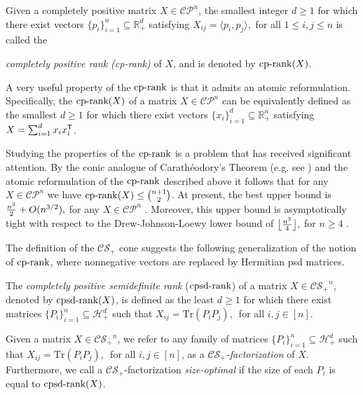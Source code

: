 \documentclass{siamart}
\begin{document}
Given a  completely positive matrix $X\in {\mathcal{CP}}^n$, the smallest integer $d\ge1$ for which there exist vectors $\{p_i\}_{i=1}^n\subseteq {\mathbb{R}}^d_+$  satisfying  $X_{ij}={\langle} p_i,p_j{\rangle},$ for all $1 \leq i,j \leq n$ is called the {{\em completely positive rank (cp-rank)}  of $X$, and is  denoted by ${\mathrm{cp}\textnormal{-rank}}(X)$.

 A  very useful property of the ${\mathrm{cp}\textnormal{-rank}}$ is that it admits an atomic reformulation.
Specifically,   the  ${\mathrm{cp}\textnormal{-rank}}(X)$  of a matrix   $X\in {\mathcal{CP}}^n$ can be equivalently defined as  the smallest  $d\ge 1$ for which there exist   vectors $\{x_i\}_{i=1}^d\subseteq {\mathbb{R}}^n_+$ satisfying~$X=\sum_{i=1}^d  x_ix_i^{{\sf T}}$.

 Studying the properties of the  ${\mathrm{cp}\textnormal{-rank}}$   is a problem that has received significant  attention.
 By the conic analogue  of Carath\'eodory's
 Theorem  (e.g. see  \cite[Theorem 1.34]{CP}) and the atomic reformulation of the ${\mathrm{cp}\textnormal{-rank}}$   described above it follows that  for any   $X\in{\mathcal{CP}}^n$   we have   ${\mathrm{cp}\textnormal{-rank}}(X)\le \binom{n+1}{2}$.
  At present, the  best upper bound is     $ {n^2\over 2}+O(n^{3/2}),$  for any $X\in {\mathcal{CP}}^n$
 \cite{BSU}. Moreover, this upper bound  is asymptotically  tight with respect to the  Drew-Johnson-Loewy  lower bound of $\big\lfloor {n^2\over 4}\big\rfloor,$ for $n\ge 4$ \cite{DJL}.

The definition of the ${\mathcal{CS}_+}$ cone suggests the  following generalization of the notion of ${\mathrm{cp}\textnormal{-rank}}$, where nonnegative vectors are replaced by Hermitian psd matrices.
\medskip 

\begin{definition}The {\em completely positive semidefinite rank} {(${\mathrm{cpsd}\textnormal{-rank}}$)} of a matrix $X\in {\mathcal{CS}_+}^n$, denoted by  ${\mathrm{cpsd}\textnormal{-rank}}(X)$,  is defined as the {least} $d\ge 1$ for which there exist matrices  $\{P_i\}_{i=1}^n\subseteq{\mathcal{H}}^d_+$  such that  $X_{ij}={\mathrm{Tr}}(P_iP_j), $\  for all $i,j\in [n]$.
\end{definition}

Given a matrix $X\in {\mathcal{CS}_+}^n$, we refer to  any family of matrices
$\{P_i\}_{i=1}^n\subseteq{\mathcal{H}}^d_+$ such that  $X_{ij}={\mathrm{Tr}}(P_iP_j),
$\  for all $i,j\in [n]$, as a {\em ${\mathcal{CS}_+}$-factorization} of $X$.
Furthermore, we  call a  ${\mathcal{CS}_+}$-factorization  {\em size-optimal}
if  the size of {each} $P_i$ is equal to  ${\mathrm{cpsd}\textnormal{-rank}}(X)$.

}
\end{document}
